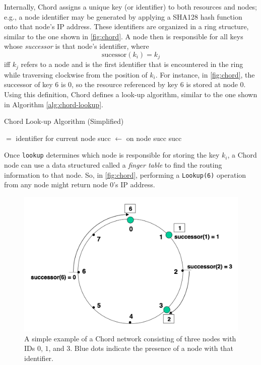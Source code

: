 \documentclass[conference]{IEEEtran}
\begin{document}
Internally, Chord assigns a unique key (or identifier) to both resources and nodes; e.g., a node identifier may be generated by applying a SHA128 hash function onto that node's IP address. These identifiers are organized in a ring structure, similar to the one shown in \autoref{fig:chord}. A node then is responsible for all keys whose \textit{successor} is that node's identifier, where $$\text{sucessor}(k_i) = k_j$$ iff $k_j$ refers to a node and is the first identifier that is encountered in the ring while traversing clockwise from the position of $k_i$. For instance, in \autoref{fig:chord}, the successor of key $6$ is $0$, so the resource referenced by key $6$ is stored at node $0$. Using this definition, Chord defines a look-up algorithm, similar to the one shown in Algorithm \autoref{alg:chord-lookup}.

\begin{algorithm}[ht]
	\caption{Chord Look-up Algorithm (Simplified)}
    \label{alg:chord-lookup}
	\begin{algorithmic}
		 $=$ identifier for current node 
		\State succ $\gets$ 
		\State {} on node succ
		\Else
		\State \Return succ 
		\EndIf
		\EndProcedure
	\end{algorithmic}
\end{algorithm}

Once \texttt{lookup} determines which node is responsible for storing the key $k_i$, a Chord node can use a data structured called a \textit{finger table} to find the routing information to that node. So, in \autoref{fig:chord}, performing a \texttt{Lookup(6)} operation from any node might return node 0's IP address.
\begin{figure}
	\centering
	\includegraphics[width=\linewidth]{chord.png}
	\caption{
		A simple example of a Chord network consisting of three nodes with IDs $0$, $1$, and $3$. Blue dots indicate the presence of a node with that identifier.
	}
	\label{fig:chord}
\end{figure}
\end{document}
